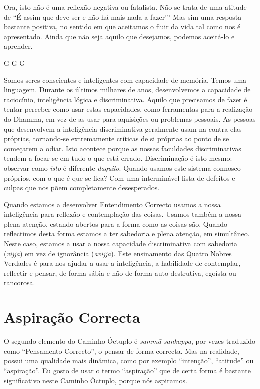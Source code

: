 Ora, isto não é uma reflexão negativa ou fatalista. Não se trata de uma atitude
de “É assim que deve ser e não há mais nada a fazer”' Mas sim uma resposta
bastante positiva, no sentido em que aceitamos o fluir da vida tal como nos é
apresentado. Ainda que não seja aquilo que desejamos, podemos aceitá-lo e
aprender.

G G G

Somos seres conscientes e inteligentes com capacidade de memória. Temos uma
linguagem. Durante os últimos milhares de anos, desenvolvemos a capacidade de
raciocínio, inteligência lógica e discriminativa. Aquilo que precisamos de fazer
é tentar perceber como usar estas capacidades, como ferramentas para a
realização do Dhamma, em vez de as usar para aquisições ou problemas pessoais.
As pessoas que desenvolvem a inteligência discriminativa geralmente usam-na
contra elas próprias, tornando-se extremamente críticas de si próprias ao ponto
de se começarem a odiar. Isto acontece porque as nossas faculdades
discriminativas tendem a focar-se em tudo o que está errado. Discriminação é
isto mesmo: observar como \emph{isto} é diferente \emph{daquilo}. Quando usamos
este sistema connosco próprios, com o que é que se fica? Com uma interminável
lista de defeitos e culpas que nos põem completamente desesperados.

Quando estamos a desenvolver Entendimento Correcto usamos a nossa inteligência
para reflexão e contemplação das coisas. Usamos também a nossa plena atenção,
estando abertos para a forma como as coisas são. Quando reflectimos desta forma
estamos a ter sabedoria e plena atenção, em simultâneo. Neste caso, estamos a
usar a nossa capacidade discriminativa com sabedoria (\emph{vijjā}) em vez de
ignorância (\emph{avijjā}). Este ensinamento das Quatro Nobres Verdades é para
nos ajudar a usar a inteligência, a habilidade de contemplar, reflectir e
pensar, de forma sábia e não de forma auto-destrutiva, egoísta ou rancorosa.

\section{Aspiração Correcta}

O segundo elemento do Caminho Óctuplo é \emph{sammā sankappa}, por vezes traduzido como
“Pensamento Correcto”, o pensar de forma correcta. Mas na realidade, possui uma
qualidade mais dinâmica, como por exemplo “intenção”, “atitude” ou “aspiração”.
Eu gosto de usar o termo “aspiração” que de certa forma é bastante significativo
neste Caminho Óctuplo, porque nós aspiramos.

